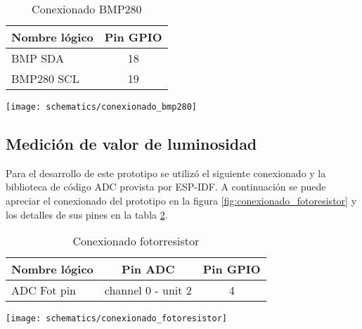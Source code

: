 \vspace{0.5cm}    
\begin{table}[h]
\centering
\caption[Conexionado BMP280]{Conexionado BMP280}
\begin{tabular}{l c }
\toprule
\textbf{Nombre lógico} &  \textbf{Pin GPIO}\\
\midrule
 BMP SDA & 18 \\
 BMP280 SCL & 19  \\
\bottomrule
\hline
\end{tabular}
\label{tab:conexionado_bmp280} 
\end{table}
    
\vspace{0.5cm}    
\begin{center}
  \texttt{[image: schematics/conexionado\_bmp280]}
    \label{fig:conexionado_bmp280}
\end{center}




\subsection{Medición de valor de luminosidad}
Para el desarrollo de este prototipo se utilizó el siguiente conexionado y la biblioteca de código ADC provista por ESP-IDF. A continuación se puede apreciar el conexionado del prototipo en la figura \ref{fig:conexionado_fotoresistor} y los detalles de sus pines en la tabla \ref{tab:conexionado_fotoresistor}.

\vspace{0.5cm}    
\begin{table}[h]
\centering
\caption[Conexionado fotorresistor]{Conexionado fotorresistor}
\begin{tabular}{l c c}
\toprule
\textbf{Nombre lógico} & \textbf{Pin ADC} & \textbf{Pin GPIO}\\
\midrule
ADC Fot pin & channel 0 - unit 2 & 4\\
\bottomrule
\hline
\end{tabular}
\label{tab:conexionado_fotoresistor}
\end{table}


\vspace{0.5cm}
\begin{center}
  \texttt{[image: schematics/conexionado\_fotoresistor]}
    \label{fig:conexionado_fotoresistor}
    
\end{center}

